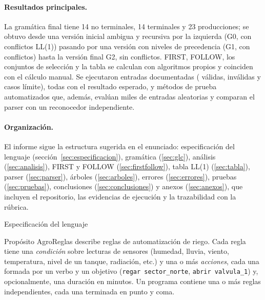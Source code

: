 \documentclass[11pt,letterpaper]{article}
\makeatletter
\renewcommand\section{\@startsection{section}{1}{\z@}{-3.2ex \@plus -1ex \@minus -.2ex}{1.6ex \@plus .2ex}%
  {\normalfont\Large\bfseries\color{acento}}}
\renewcommand\subsection{\@startsection{subsection}{2}{\z@}{-2.6ex\@plus -1ex \@minus -.2ex}{1.0ex \@plus .2ex}%
  {\normalfont\large\bfseries}}
\newcommand{\T}[1]{\texttt{#1}}
\makeatother
\begin{document}
\paragraph{Resultados principales.} La gramática final tiene 14 no terminales, 14 terminales y
23 producciones; se obtuvo desde una versión inicial ambigua y recursiva por la izquierda (G0, con
\NumConflictosGcero{} conflictos LL(1)) pasando por una versión con niveles de precedencia (G1, con
\NumConflictosGuno{} conflictos) hasta la versión final G2, sin conflictos. FIRST, FOLLOW, los conjuntos de
selección y la tabla se calculan con algoritmos propios y coinciden con el cálculo manual. Se ejecutaron
\NumCasos{} entradas documentadas (\NumValidas{} válidas, \NumInvalidas{} inválidas y \NumLimite{} casos
límite), todas con el resultado esperado, y \NumMetodos{} métodos de prueba automatizados que, además, evalúan
miles de entradas aleatorias y comparan el parser con un reconocedor independiente.

\paragraph{Organización.} El informe sigue la estructura sugerida en el enunciado: especificación del
lenguaje (sección~\ref{sec:especificacion}), gramática (\ref{sec:glc}), análisis (\ref{sec:analisis}),
FIRST y FOLLOW (\ref{sec:firstfollow}), tabla LL(1) (\ref{sec:tabla}), parser (\ref{sec:parser}),
árboles (\ref{sec:arboles}), errores (\ref{sec:errores}), pruebas (\ref{sec:pruebas}), conclusiones
(\ref{sec:conclusiones}) y anexos (\ref{sec:anexos}), que incluyen el repositorio, las evidencias de ejecución
y la trazabilidad con la rúbrica.

\section{Especificación del lenguaje}\label{sec:especificacion}

\subsection{Propósito}
AgroReglas describe reglas de automatización de riego. Cada regla tiene una \emph{condición} sobre lecturas
de sensores (humedad, lluvia, viento, temperatura, nivel de un tanque, radiación, etc.) y una o más
\emph{acciones}, cada una formada por un verbo y un objetivo (\T{regar sector\_norte},
\T{abrir valvula\_1}) y, opcionalmente, una duración en minutos. Un programa contiene una o más reglas
independientes, cada una terminada en punto y coma.
\end{document}
